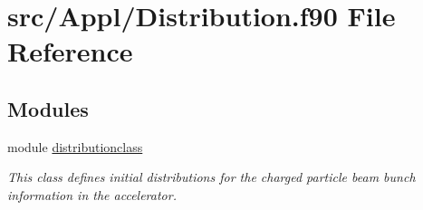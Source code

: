 \hypertarget{_distribution_8f90}{}\section{src/\+Appl/\+Distribution.f90 File Reference}
\label{_distribution_8f90}
\subsection*{Modules}
\begin{DoxyCompactItemize}
\item 
module \mbox{\hyperlink{namespacedistributionclass}{distributionclass}}
\begin{DoxyCompactList}\small\item\em This class defines initial distributions for the charged particle beam bunch information in the accelerator. \end{DoxyCompactList}\end{DoxyCompactItemize}
